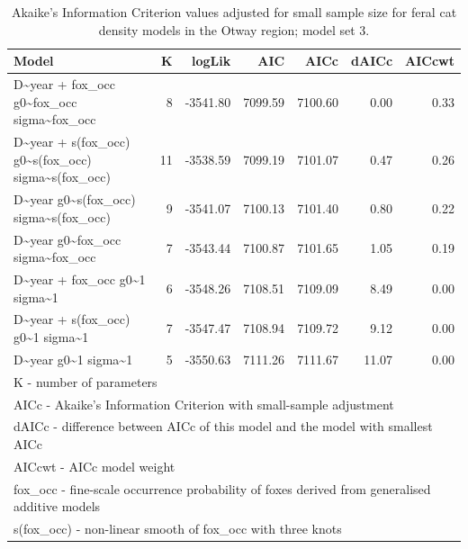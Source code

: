 \documentclass[11pt,a4paper,titlepage,twoside,openright]{style/unimelbthesis}
\begin{document}
\begin{mainmatter}
\begingroup\fontsize{10}{12}\selectfont
\begin{longtable}[t]{lrrrrrr}
\caption{\label{tab:density-aic-o-3}Akaike's Information Criterion values adjusted for small sample size for feral cat density models in the Otway region; model set 3.}\\
\toprule
Model & K & logLik & AIC & AICc & dAICc & AICcwt\\
\midrule
D\textasciitilde{}year + fox\_occ g0\textasciitilde{}fox\_occ sigma\textasciitilde{}fox\_occ & 8 & -3541.80 & 7099.59 & 7100.60 & 0.00 & 0.33\\
D\textasciitilde{}year + s(fox\_occ) g0\textasciitilde{}s(fox\_occ) sigma\textasciitilde{}s(fox\_occ) & 11 & -3538.59 & 7099.19 & 7101.07 & 0.47 & 0.26\\
D\textasciitilde{}year g0\textasciitilde{}s(fox\_occ) sigma\textasciitilde{}s(fox\_occ) & 9 & -3541.07 & 7100.13 & 7101.40 & 0.80 & 0.22\\
D\textasciitilde{}year g0\textasciitilde{}fox\_occ sigma\textasciitilde{}fox\_occ & 7 & -3543.44 & 7100.87 & 7101.65 & 1.05 & 0.19\\
D\textasciitilde{}year + fox\_occ g0\textasciitilde{}1 sigma\textasciitilde{}1 & 6 & -3548.26 & 7108.51 & 7109.09 & 8.49 & 0.00\\
\addlinespace
D\textasciitilde{}year + s(fox\_occ) g0\textasciitilde{}1 sigma\textasciitilde{}1 & 7 & -3547.47 & 7108.94 & 7109.72 & 9.12 & 0.00\\
D\textasciitilde{}year g0\textasciitilde{}1 sigma\textasciitilde{}1 & 5 & -3550.63 & 7111.26 & 7111.67 & 11.07 & 0.00\\
\bottomrule
\multicolumn{7}{l}{\rule{0pt}{1em}K - number of parameters}\\
\multicolumn{7}{l}{\rule{0pt}{1em}AICc - Akaike's Information Criterion with small-sample adjustment}\\
\multicolumn{7}{l}{\rule{0pt}{1em}dAICc - difference between AICc of this model and the model with smallest AICc}\\
\multicolumn{7}{l}{\rule{0pt}{1em}AICcwt - AICc model weight}\\
\multicolumn{7}{l}{\rule{0pt}{1em}fox\_occ - fine-scale occurrence probability of foxes derived from generalised additive models}\\
\multicolumn{7}{l}{\rule{0pt}{1em}s(fox\_occ) - non-linear smooth of fox\_occ with three knots}\\
\end{longtable}
\endgroup{}


\end{mainmatter}
\end{document}
